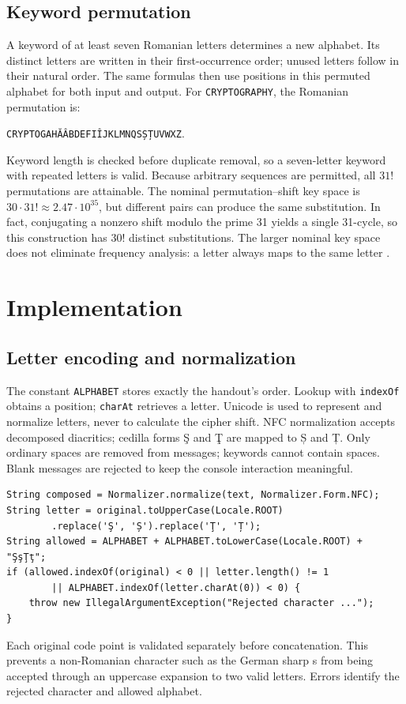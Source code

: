 \documentclass{utmreport}
\begin{document}
\section{Keyword permutation}
A keyword of at least seven Romanian letters determines a new alphabet. Its distinct letters are written in their first-occurrence order; unused letters follow in their natural order. The same formulas then use positions in this permuted alphabet for both input and output. For \texttt{CRYPTOGRAPHY}, the Romanian permutation is:
\begin{center}\texttt{CRYPTOGAHĂÂBDEFIÎJKLMNQSȘȚUVWXZ}.\end{center}
Keyword length is checked before duplicate removal, so a seven-letter keyword with repeated letters is valid. Because arbitrary sequences are permitted, all $31!$ permutations are attainable. The nominal permutation--shift key space is $30\cdot31!\approx2.47\cdot10^{35}$, but different pairs can produce the same substitution. In fact, conjugating a nonzero shift modulo the prime 31 yields a single 31-cycle, so this construction has $30!$ distinct substitutions. The larger nominal key space does not eliminate frequency analysis: a letter always maps to the same letter \cite{handout}.

\chapter{Implementation}
\section{Letter encoding and normalization}
The constant \texttt{ALPHABET} stores exactly the handout's order. Lookup with \texttt{indexOf} obtains a position; \texttt{charAt} retrieves a letter. Unicode is used to represent and normalize letters, never to calculate the cipher shift. NFC normalization accepts decomposed diacritics; cedilla forms Ş and Ţ are mapped to Ș and Ț. Only ordinary spaces are removed from messages; keywords cannot contain spaces. Blank messages are rejected to keep the console interaction meaningful.
\begin{lstlisting}
String composed = Normalizer.normalize(text, Normalizer.Form.NFC);
String letter = original.toUpperCase(Locale.ROOT)
        .replace('Ş', 'Ș').replace('Ţ', 'Ț');
String allowed = ALPHABET + ALPHABET.toLowerCase(Locale.ROOT) + "ŞşŢţ";
if (allowed.indexOf(original) < 0 || letter.length() != 1
        || ALPHABET.indexOf(letter.charAt(0)) < 0) {
    throw new IllegalArgumentException("Rejected character ...");
}
\end{lstlisting}
Each original code point is validated separately before concatenation. This prevents a non-Romanian character such as the German sharp s from being accepted through an uppercase expansion to two valid letters. Errors identify the rejected character and allowed alphabet.
\end{document}
